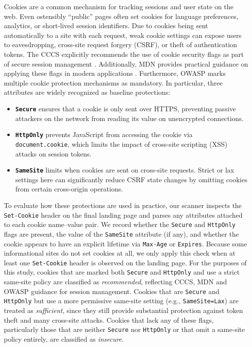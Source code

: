 \documentclass[pdflatex,sn-mathphys-num]{sn-jnl}
\numberwithin{equation}{section}
\theoremstyle{thmstyleone}
\theoremstyle{thmstyletwo}%
\theoremstyle{thmstylethree}%
\begin{document}
\vspace{1em}Cookies are a common mechanism for tracking sessions and user state on the web. 
Even ostensibly ``public'' pages often set cookies for language preferences, analytics, or short-lived 
session identifiers. Due to cookies being sent automatically to a site with each request, weak cookie settings can expose
users to eavesdropping, cross-site request forgery (CSRF), or theft of authentication tokens. The CCCS 
explicitly recommends the use of cookie security flags as part of secure session
management \cite{cccs_itsp_40_111}. Additionally, MDN provides practical guidance on applying these flags in modern 
applications \cite{mdn_secure_cookie_configuration}. Furthermore, OWASP marks multiple cookie protection mechanisms as mandatory.
In particular, three attributes are widely recognized as baseline protections:
\begin{itemize}
  \item \textbf{\texttt{Secure}} ensures that a cookie is only sent over HTTPS, preventing passive attackers on the network from reading its value on unencrypted connections.
  \item \textbf{\texttt{HttpOnly}} prevents JavaScript from accessing the cookie via \texttt{document.cookie}, which limits the impact of cross-site scripting (XSS) attacks on session tokens.
  \item \textbf{\texttt{SameSite}} limits when cookies are sent on cross-site requests. Strict or lax settings here can significantly reduce CSRF state changes by omitting cookies from certain cross-origin operations.
\end{itemize}

To evaluate how these protections are used in practice, our scanner inspects the \texttt{Set-Cookie} header on the final 
landing page and parses any attributes attached to each cookie name–value pair. We record whether the \texttt{Secure} and 
\texttt{HttpOnly} flags are present, the value of the \texttt{SameSite} attribute (if any), and whether
 the cookie appears to have an explicit lifetime via \texttt{Max-Age} or \texttt{Expires}. 
Because some informational sites do not set 
cookies at all, we only apply this check when at least one \texttt{Set-Cookie} header is observed on the 
landing page. For the purposes of this study, cookies that are marked both \texttt{Secure} and \texttt{HttpOnly} and use a strict
same-site policy are classified as \emph{recommended}, 
reflecting CCCS, MDN and OWASP guidance for session management. 
Cookies that are \texttt{Secure} and \texttt{HttpOnly} but use a more permissive same-site setting 
(e.g., \texttt{SameSite=Lax}) are treated as \emph{sufficient}, 
since they still provide substantial protection against token theft and many cross-site attacks. 
Cookies that lack any of these flags, particularly those that are neither \texttt{Secure} nor \texttt{HttpOnly} 
or that omit a same-site policy entirely, are classified as \emph{insecure}. 
\end{document}
